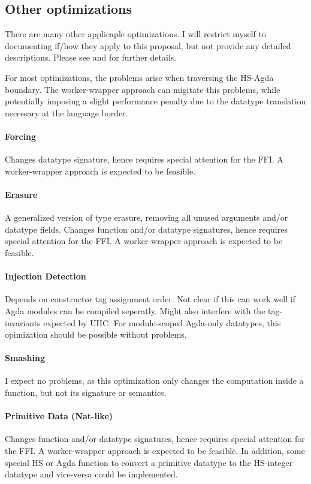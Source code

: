 \documentclass[12pt, a4paper, twoside]{report}
\begin{document}
\subsection{Other optimizations}
There are many other applicaple optimizations. I will restrict myself to documenting if/how they apply to this proposal,
but not provide any detailed descriptions. Please see \cite{fredriksson2011totaly} and \cite{Brady-store-indices2004}
for further details.

For most optimizations, the problems arise when traversing the HS-Agda boundary. The worker-wrapper
approach can migitate this problems, while potentially imposing a slight performance penalty due to the
datatype translation necessary at the language border.
\paragraph{Forcing}
Changes datatype signature, hence requires special attention for the FFI.
A worker-wrapper approach is expected to be feasible.

\paragraph{Erasure}
A generalized version of type erasure, removing all unused arguments and/or datatype fields.
Changes function and/or datatype signatures, hence requires special attention for the FFI.
A worker-wrapper approach is expected to be feasible.

\paragraph{Injection Detection}
Depends on constructor tag assignment order. Not clear if this can work well if Agda modules can be compiled
seperatly. Might also interfere with the tag-invariants expected by UHC.
For module-scoped Agda-only datatypes, this opimization should be possible without
problems.

\paragraph{Smashing}
I expect no problems, as this optimization only changes the computation inside a function, but not
its signature or semantics.

\paragraph{Primitive Data (Nat-like)}
Changes function and/or datatype signatures, hence requires special attention for the FFI.
A worker-wrapper approach is expected to be feasible. In addition, some special
HS or Agda function to convert a primitive datatype to the HS-integer datatype and vice-versa could be
implemented.
\end{document}
